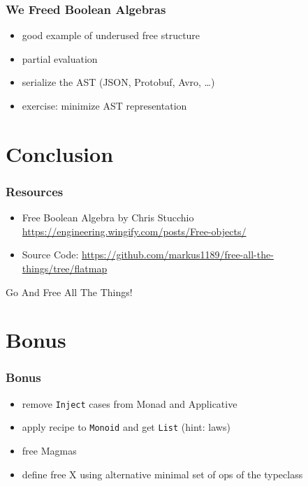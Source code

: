\documentclass{beamer}
\begin{document}
\begin{frame}
  \frametitle{We Freed Boolean Algebras}
  \begin{itemize}
  \item good example of underused free structure
  \item partial evaluation
  \item serialize the AST (JSON, Protobuf, Avro, \ldots{})
  \item exercise: minimize AST representation
  \end{itemize}
\end{frame}

\section{Conclusion}\label{sec:conclusion}

\begin{frame}
  \frametitle{Resources}
  \begin{itemize}
  \item Free Boolean Algebra by Chris Stucchio \url{https://engineering.wingify.com/posts/Free-objects/}
  \item Source Code: \url{https://github.com/markus1189/free-all-the-things/tree/flatmap}
  \end{itemize}
\end{frame}

\begin{frame}
  \begin{center}
    \Huge
    Go And Free All The Things!
  \end{center}
\end{frame}

\begin{frame}
  \tableofcontents{}
\end{frame}

\appendix{}

\section*{Bonus}\label{sec:bonus}

\begin{frame}
  \frametitle{Bonus}
  \begin{itemize}
  \item remove \texttt{Inject} cases from Monad and Applicative
  \item apply recipe to \texttt{Monoid} and get \texttt{List} (hint: laws)
  \item free Magmas
  \item define free X using alternative minimal set of ops of the typeclass
  \end{itemize}
\end{frame}
\end{document}

